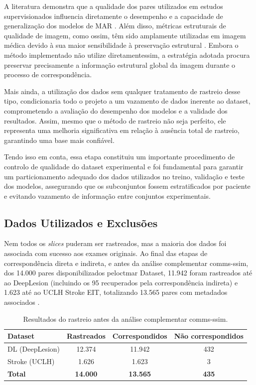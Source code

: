A literatura demonstra que a qualidade dos pares utilizados em estudos supervisionados influencia diretamente o desempenho e a capacidade de generalização dos modelos de MAR \cite{linDuDoNetDualDomain2019, kleberAdvancementsSupervisedDeep2024}. Além disso, métricas estruturais de qualidade de imagem, como o\acrshort{ssim}, têm sido amplamente utilizadas em imagem médica devido à sua maior sensibilidade à preservação estrutural \cite{zhouwangImageQualityAssessment2004}. Embora o método implementado não utilize diretamente\acrshort{ssim}, a estratégia adotada procura preservar precisamente a informação estrutural global da imagem durante o processo de correspondência.

Mais ainda, a utilização dos dados sem qualquer tratamento de rastreio desse tipo, condicionaria todo o projeto a um vazamento de dados inerente ao dataset, comprometendo a avaliação do desempenho dos modelos e a validade dos resultados. Assim, mesmo que o método de rastreio não seja perfeito, ele representa uma melhoria significativa em relação à ausência total de rastreio, garantindo uma base mais confiável.

Tendo isso em conta, essa etapa constituiu um importante procedimento de controlo de qualidade do dataset experimental e foi fundamental para garantir um particionamento adequado dos dados utilizados no treino, validação e teste dos modelos, assegurando que os subconjuntos fossem estratificados por paciente e evitando vazamento de informação entre conjuntos experimentais.


\subsection{Dados Utilizados e Exclusões}
Nem todos os \textit{slices} puderam ser rastreados, mas a maioria dos dados foi associada com sucesso aos exames originais. Ao final das etapas de correspondência direta e indireta, e antes da análise complementar com\acrshort{ms-ssim}, dos 14.000 pares disponibilizados pelo\acrshort{ctmar} Dataset, 11.942 foram rastreados até ao DeepLesion (incluindo os 95 recuperados pela correspondência indireta) e 1.623 até ao UCLH Stroke EIT, totalizando 13.565 pares com metadados associados . 

\begin{table}[H]
    \centering
    \caption{Resultados do rastreio antes da análise complementar com\acrshort{ms-ssim}.}
    \label{tab:rastreio_msssim}
    \begin{tabular}{lccc}
        \hline
        \textbf{Dataset} & \textbf{Rastreados} & \textbf{Correspondidos} & \textbf{Não correspondidos} \\
        \hline
        DL (DeepLesion) & 12.374 & 11.942 & 432 \\
        Stroke (UCLH)   & 1.626  & 1.623  & 3   \\
        \hline
        \textbf{Total}  & \textbf{14.000} & \textbf{13.565} & \textbf{435} \\
        \hline
    \end{tabular}
\end{table}

